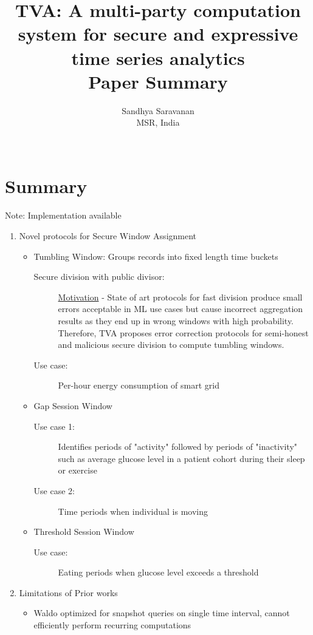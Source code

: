 \documentclass{article}
\title{TVA: A multi-party computation system for secure and expressive time series analytics \large \\Paper Summary}
\author{Sandhya Saravanan\\
  \small MSR, India\\\\
}
\date{\vspace{-5ex}}
\begin{document}
\maketitle

\section{Summary}
Note: Implementation available
\begin{enumerate}
   \item Novel protocols for Secure Window Assignment
   \begin{itemize}
     \item Tumbling Window: Groups records into fixed length time buckets
     \begin{description}
     \item[Secure division with public divisor:] \underline{Motivation} - State of art protocols for fast division produce small errors acceptable in ML use cases but cause incorrect aggregation results as they end up in wrong windows with high probability. Therefore, TVA proposes error correction protocols for semi-honest and malicious secure division to compute tumbling windows. 
     \item[Use case:] Per-hour energy consumption of smart grid
     \end{description}
     \item Gap Session Window 
    \begin{description}
     \item[Use case 1:] Identifies periods of "activity" followed by periods of "inactivity" such as average glucose level in a patient cohort during their sleep or exercise
     \item[Use case 2:] Time periods when individual is moving
     \end{description} 
     \item Threshold Session Window
     \begin{description}
     \item[Use case:] Eating periods when glucose level exceeds a threshold 
     \end{description}
   \end{itemize}
    \item Limitations of Prior works
    \begin{itemize}
       \item Waldo optimized for snapshot queries on single time interval, cannot efficiently perform recurring computations
        \begin{description}

\end{description}
\end{itemize}
\end{enumerate}
\end{document}
